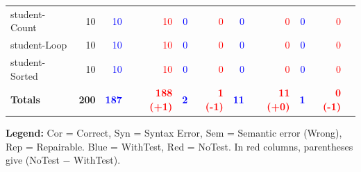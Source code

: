 \documentclass{article}
\begin{document}
\begin{table}[ht]
{\begin{tabular}{lrrrrrrrrrr}
student-Count                  & 10 & \textcolor{blue}{10}  & \textcolor{red}{10}   & \textcolor{blue}{0}  & \textcolor{red}{0}   & \textcolor{blue}{0}  & \textcolor{red}{0}   & \textcolor{blue}{0}  & \textcolor{red}{0}   \\
student-Loop                   & 10 & \textcolor{blue}{10}  & \textcolor{red}{10}   & \textcolor{blue}{0}  & \textcolor{red}{0}   & \textcolor{blue}{0}  & \textcolor{red}{0}   & \textcolor{blue}{0}  & \textcolor{red}{0}   \\
student-Sorted                 & 10 & \textcolor{blue}{10}  & \textcolor{red}{10}   & \textcolor{blue}{0}  & \textcolor{red}{0}   & \textcolor{blue}{0}  & \textcolor{red}{0}   & \textcolor{blue}{0}  & \textcolor{red}{0}   \\
\midrule
\textbf{Totals}             & \textbf{200} &
\textcolor{blue}{\textbf{187}} & \textcolor{red}{\textbf{188 (+1)}} &
\textcolor{blue}{\textbf{2}} & \textcolor{red}{\textbf{1 (-1)}}  &
\textcolor{blue}{\textbf{11}} & \textcolor{red}{\textbf{11 (+0)}}   &
\textcolor{blue}{\textbf{1}} & \textcolor{red}{\textbf{0 (-1)}}   \\
\bottomrule
\end{tabular}%
}

\vspace{0.5em}
\raggedright
\textbf{Legend:} Cor = Correct, Syn = Syntax Error, Sem = Semantic error (Wrong), Rep = Repairable. Blue = WithTest, Red = NoTest. In red columns, parentheses give (NoTest $-$ WithTest).
\end{table}
\end{document}
